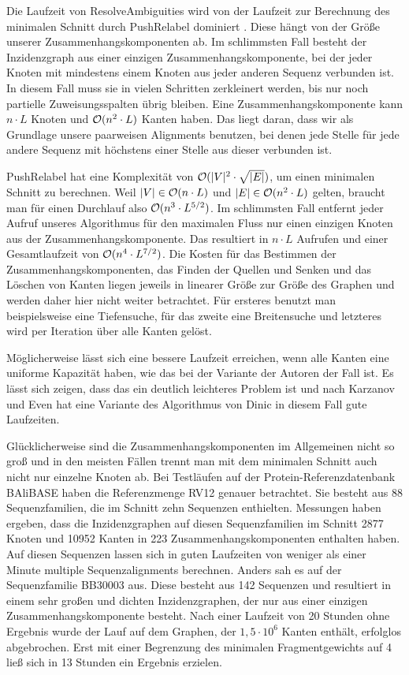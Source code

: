 Die Laufzeit von \textrm{ResolveAmbiguities} wird von der Laufzeit zur Berechnung des minimalen Schnitt durch \textrm{PushRelabel} dominiert \cite{cpm10}. Diese hängt von der Größe unserer Zusammenhangskomponenten ab. Im schlimmsten Fall besteht der Inzidenzgraph aus einer einzigen Zusammenhangskomponente, bei der jeder Knoten mit mindestens einem Knoten aus jeder anderen Sequenz verbunden ist. In diesem Fall muss sie in vielen Schritten zerkleinert werden, bis nur noch partielle Zuweisungsspalten übrig bleiben. Eine Zusammenhangskomponente kann $n\cdot L$ Knoten und $\mathcal{O}(n^2\cdot L)$ Kanten haben. Das liegt daran, dass wir als Grundlage unsere paarweisen Alignments benutzen, bei denen jede Stelle für jede andere Sequenz mit höchstens einer Stelle aus dieser verbunden ist. 

\textrm{PushRelabel} hat eine Komplexität von $\mathcal{O}(|V|^2\cdot \sqrt{|E|})$, um einen minimalen Schnitt zu berechnen. Weil $|V| \in \mathcal{O}(n\cdot L)$ und $|E| \in \mathcal{O}(n^2\cdot L)$ gelten, braucht man für einen Durchlauf also $\mathcal{O}(n^3\cdot L^{5/2})$. Im schlimmsten Fall entfernt jeder Aufruf unseres Algorithmus für den maximalen Fluss nur einen einzigen Knoten aus der Zusammenhangskomponente. Das resultiert in $n\cdot L$ Aufrufen und einer Gesamtlaufzeit von $\mathcal{O}(n^4\cdot L^{7/2})$. Die Kosten für das Bestimmen der Zusammenhangskomponenten, das Finden der Quellen und Senken und das Löschen von Kanten liegen jeweils in linearer Größe zur Größe des Graphen und werden daher hier nicht weiter betrachtet. Für ersteres benutzt man beispielsweise eine Tiefensuche, für das zweite eine Breitensuche und letzteres wird per Iteration über alle Kanten gelöst.

Möglicherweise lässt sich eine bessere Laufzeit erreichen, wenn alle Kanten eine uniforme Kapazität haben, wie das bei der Variante der Autoren der Fall ist. Es lässt sich zeigen, dass das ein deutlich leichteres Problem ist \cite{gt14} und nach Karzanov und Even hat eine Variante des Algorithmus von Dinic in diesem Fall gute Laufzeiten.

Glücklicherweise sind die Zusammenhangskomponenten im Allgemeinen nicht so groß und in den meisten Fällen trennt man mit dem minimalen Schnitt auch nicht nur einzelne Knoten ab. Bei Testläufen auf der Protein-Referenzdatenbank BAliBASE haben \cite{cpm10} die Referenzmenge RV12 genauer betrachtet. Sie besteht aus 88 Sequenzfamilien, die im Schnitt zehn Sequenzen enthielten. Messungen haben ergeben, dass die Inzidenzgraphen auf diesen Sequenzfamilien im Schnitt 2877 Knoten und 10952 Kanten in 223 Zusammenhangskomponenten enthalten haben. Auf diesen Sequenzen lassen sich in guten Laufzeiten von weniger als einer Minute multiple Sequenzalignments berechnen. Anders sah es auf der Sequenzfamilie BB30003 aus. Diese besteht aus 142 Sequenzen und resultiert in einem sehr großen und dichten Inzidenzgraphen, der nur aus einer einzigen Zusammenhangskomponente besteht. Nach einer Laufzeit von 20 Stunden ohne Ergebnis wurde der Lauf auf dem Graphen, der $1,5\cdot 10^6$ Kanten enthält, erfolglos abgebrochen. Erst mit einer Begrenzung des minimalen Fragmentgewichts auf 4 ließ sich in 13 Stunden ein Ergebnis erzielen. 

